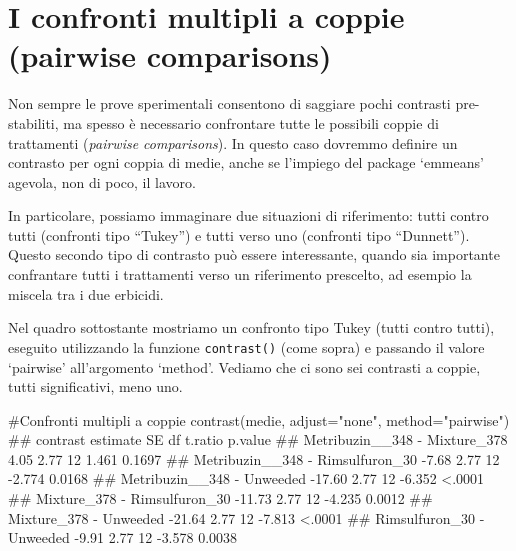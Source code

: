 \documentclass[a4paper,12pt,oneside]{book}
\newenvironment{Shaded}{\begin{snugshade}}{\end{snugshade}}
\newcommand{\StringTok}[1]{#1}
\newcommand{\CommentTok}[1]{#1}
\newcommand{\DocumentationTok}[1]{#1}
\newcommand{\FunctionTok}[1]{#1}
\newcommand{\AttributeTok}[1]{#1}
\newcommand{\NormalTok}[1]{#1}
\begin{document}
\hypertarget{i-confronti-multipli-a-coppie-pairwise-comparisons}{%
\section{I confronti multipli a coppie (pairwise comparisons)}\label{i-confronti-multipli-a-coppie-pairwise-comparisons}}

Non sempre le prove sperimentali consentono di saggiare pochi contrasti pre-stabiliti, ma spesso è necessario confrontare tutte le possibili coppie di trattamenti (\emph{pairwise comparisons}). In questo caso dovremmo definire un contrasto per ogni coppia di medie, anche se l'impiego del package `emmeans' agevola, non di poco, il lavoro.

In particolare, possiamo immaginare due situazioni di riferimento: tutti contro tutti (confronti tipo ``Tukey'') e tutti verso uno (confronti tipo ``Dunnett''). Questo secondo tipo di contrasto può essere interessante, quando sia importante confrantare tutti i trattamenti verso un riferimento prescelto, ad esempio la miscela tra i due erbicidi.

Nel quadro sottostante mostriamo un confronto tipo Tukey (tutti contro tutti), eseguito utilizzando la funzione \texttt{contrast()} (come sopra) e passando il valore `pairwise' all'argomento `method'. Vediamo che ci sono sei contrasti a coppie, tutti significativi, meno uno.

\footnotesize

\begin{Shaded}
\begin{Highlighting}[]
\CommentTok{\#Confronti multipli a coppie}
\FunctionTok{contrast}\NormalTok{(medie, }\AttributeTok{adjust=}\StringTok{"none"}\NormalTok{, }\AttributeTok{method=}\StringTok{"pairwise"}\NormalTok{)}
\DocumentationTok{\#\#  contrast                         estimate   SE df t.ratio p.value}
\DocumentationTok{\#\#  Metribuzin\_\_348 {-} Mixture\_378        4.05 2.77 12   1.461  0.1697}
\DocumentationTok{\#\#  Metribuzin\_\_348 {-} Rimsulfuron\_30    {-}7.68 2.77 12  {-}2.774  0.0168}
\DocumentationTok{\#\#  Metribuzin\_\_348 {-} Unweeded         {-}17.60 2.77 12  {-}6.352  \textless{}.0001}
\DocumentationTok{\#\#  Mixture\_378 {-} Rimsulfuron\_30       {-}11.73 2.77 12  {-}4.235  0.0012}
\DocumentationTok{\#\#  Mixture\_378 {-} Unweeded             {-}21.64 2.77 12  {-}7.813  \textless{}.0001}
\DocumentationTok{\#\#  Rimsulfuron\_30 {-} Unweeded           {-}9.91 2.77 12  {-}3.578  0.0038}
\end{Highlighting}
\end{Shaded}
\end{document}
